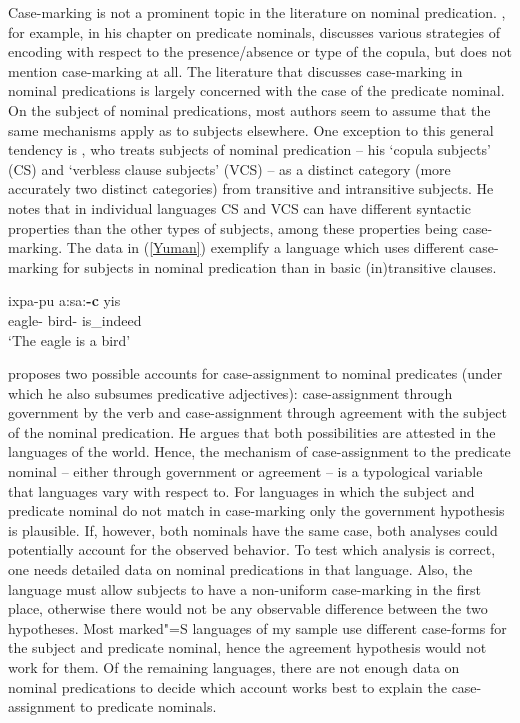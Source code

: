 Case-marking is not a prominent topic in the literature on nominal predication. 
\citet[111]{Payne:1997}, for example, in his chapter on predicate nominals, discusses various strategies of encoding with respect to the presence/absence or type of the copula, but does not mention case-marking at all. 
The literature that discusses case-marking in nominal predications is largely concerned with the case of the predicate nominal. 
On the subject of nominal predications, most authors seem to assume that the same mechanisms apply as to subjects elsewhere. 
One exception to this general tendency is \citet[162,~165--168]{Dixon:2010-2}, who treats subjects of nominal predication -- his `copula subjects' (CS) and `verbless clause subjects' (VCS) -- as a distinct category (more accurately two distinct categories) from transitive and intransitive subjects. 
He notes that in individual languages CS and VCS can have different syntactic properties than the other types of subjects, among these properties being case-marking.
The data in (\ref{Yuman}) exemplify a language which uses different case-marking for subjects in nominal predication than in basic (in)transitive clauses. 


\begin{exe}\ex\label{Yuman}
\gll ixpa-pu a:sa:\textbf{-c} yis\\
     eagle-\dem{} bird-\nom{} is\_indeed\\
\glt `The eagle is a bird'
\end{exe}

\citet{Comrie:1997} proposes two possible accounts for case-assignment to nominal predicates (under which he also subsumes predicative adjectives): case-assign\-ment through government by the verb and case-assignment through agreement with the subject of the nominal predication.  
He argues that both possibilities are attested in the languages of the world. 
Hence, the mechanism of case-assignment to the predicate nominal -- either through government or agreement -- is a typological variable that languages vary with respect to. 
For languages in which the subject and predicate nominal do not match in case-marking only the government hypothesis is plausible. 
If, however,  both nominals have the same case, both analyses could potentially account for the observed behavior. 
To test which analysis is correct, one needs detailed data on nominal predications in that language. 
Also, the language must allow subjects to have a non-uniform case-marking in the first place, otherwise there would not be any observable difference between the two hypotheses. 
Most marked"=S languages of my sample use different case-forms for the subject and predicate nominal, hence the agreement hypothesis would not work for them. 
Of the remaining languages, there are not enough data on nominal predications to decide which account works best to explain the case-assignment to predicate nominals. 

